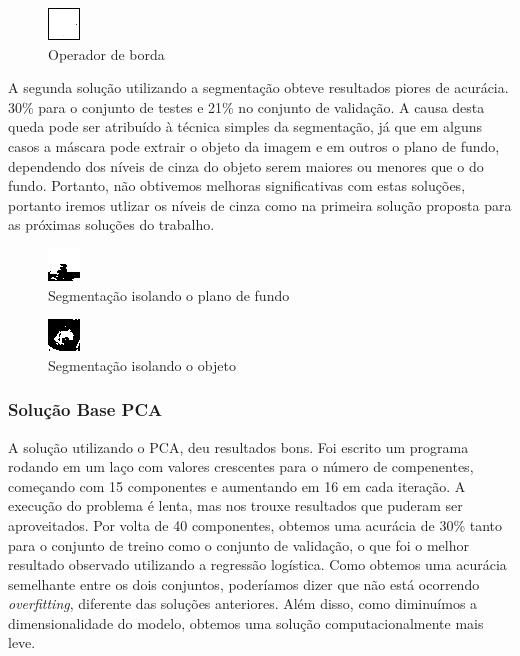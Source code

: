 \documentclass[conference]{IEEEtran}
\begin{document}
\begin{figure}[H]
  \includegraphics[center]{bor.png}
  \caption{Operador de borda}
  \label{fig:frog1}
\end{figure}

A segunda solução utilizando a segmentação obteve resultados piores de acurácia. 30\% para o conjunto de testes e 21\% no conjunto de validação. A causa desta queda pode ser atribuído à técnica simples da segmentação, já que em alguns casos a máscara pode extrair o objeto da imagem e em outros o plano de fundo, dependendo dos níveis de cinza do objeto serem maiores ou menores que o do fundo. Portanto, não obtivemos melhoras significativas com estas soluções, portanto iremos utlizar os níveis de cinza como na primeira solução proposta para as próximas soluções do trabalho.

\begin{figure}[H]
  \includegraphics[center]{seg1.png}
  \caption{Segmentação isolando o plano de fundo}
  \label{fig:boat1}
\end{figure}

\begin{figure}[H]
  \includegraphics[center]{seg2.png}
  \caption{Segmentação isolando o objeto}
  \label{fig:frog1}
\end{figure}

\subsubsection{Solução Base PCA}
A solução utilizando o PCA, deu resultados bons. Foi escrito um programa rodando em um laço com valores crescentes para o número de compenentes, começando com 15 componentes e aumentando em 16 em cada iteração. A execução do problema é lenta, mas nos trouxe resultados que puderam ser aproveitados. Por volta de 40 componentes, obtemos uma acurácia de 30\% tanto para o conjunto de treino como o conjunto de validação, o que foi o melhor resultado observado utilizando a regressão logística. Como obtemos uma acurácia semelhante entre os dois conjuntos, poderíamos dizer que não está ocorrendo \textit{overfitting}, diferente das soluções anteriores. Além disso, como diminuímos a dimensionalidade do modelo, obtemos uma solução computacionalmente mais leve.
\end{document}
